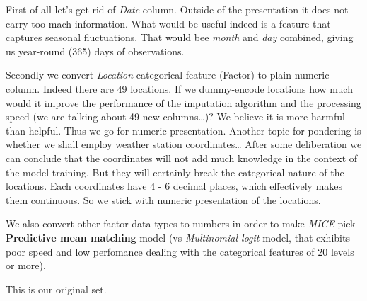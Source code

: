 First of all let's get rid of \emph{Date} column. Outside of the
presentation it does not carry too mach information. What would be
useful indeed is a feature that captures seasonal fluctuations. That
would bee \emph{month} and \emph{day} combined, giving us year-round
(365) days of observations.

Secondly we convert \emph{Location} categorical feature (Factor) to
plain numeric column. Indeed there are 49 locations. If we dummy-encode
locations how much would it improve the performance of the imputation
algorithm and the processing speed (we are talking about 49 new
columns\ldots{})? We believe it is more harmful than helpful. Thus we go
for numeric presentation. Another topic for pondering is whether we
shall employ weather station coordinates\ldots{} After some deliberation
we can conclude that the coordinates will not add much knowledge in the
context of the model training. But they will certainly break the
categorical nature of the locations. Each coordinates have 4 - 6 decimal
places, which effectively makes them continuous. So we stick with
numeric presentation of the locations.

We also convert other factor data types to numbers in order to make
\emph{MICE} pick \textbf{Predictive mean matching} model (vs
\emph{Multinomial logit} model, that exhibits poor speed and low
perfomance dealing with the categorical features of 20 levels or more).

This is our original set.

